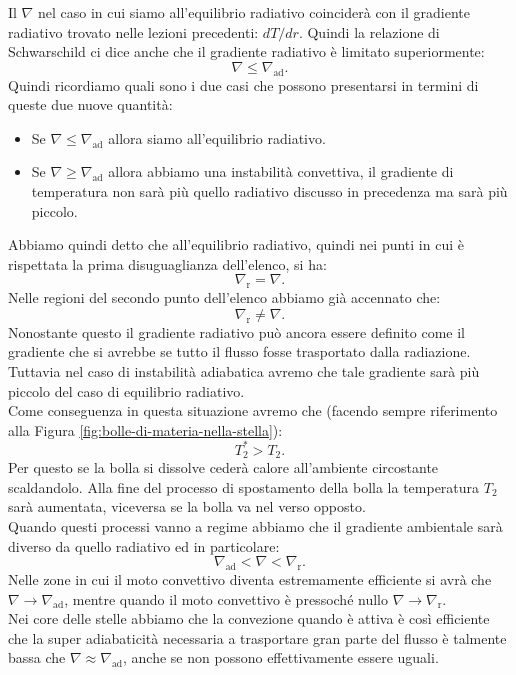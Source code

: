 Il $\nabla$ nel caso in cui siamo all'equilibrio radiativo coinciderà con il gradiente radiativo trovato nelle lezioni precedenti: $dT/dr$.
Quindi la relazione di Schwarschild ci dice anche che il gradiente radiativo è limitato superiormente:
\[
	\nabla \le \nabla_\text{ad} 
.\] 
Quindi ricordiamo quali sono i due casi che possono presentarsi in termini di queste due nuove quantità:
\begin{itemize}
	\item Se $\nabla \le \nabla_\text{ad}$ allora siamo all'equilibrio radiativo.
	\item Se $\nabla \ge \nabla_\text{ad}$ allora abbiamo una instabilità convettiva,
		il gradiente di temperatura non sarà più quello radiativo discusso in
		precedenza ma sarà più piccolo.
\end{itemize}
Abbiamo quindi detto che all'equilibrio radiativo, quindi nei punti in cui è rispettata la prima disuguaglianza dell'elenco, si ha:
\[
	\nabla_\text{r} = \nabla
.\] 
Nelle regioni del secondo punto dell'elenco abbiamo già accennato che:
\[
	\nabla_\text{r} \neq \nabla
.\] 
Nonostante questo il gradiente radiativo può ancora essere definito come il gradiente che si avrebbe se tutto il flusso fosse trasportato dalla radiazione. Tuttavia nel caso di instabilità adiabatica avremo che tale gradiente sarà più piccolo del caso di equilibrio radiativo.\\
Come conseguenza in questa situazione avremo che (facendo sempre riferimento alla Figura \ref{fig:bolle-di-materia-nella-stella}):
\[
	T_2^* > T_2
.\] 
Per questo se la bolla si dissolve cederà calore all'ambiente circostante scaldandolo. Alla fine del processo di spostamento della bolla la temperatura $T_2$ sarà aumentata, viceversa se la bolla va nel verso opposto. \\
Quando questi processi vanno a regime abbiamo che il gradiente ambientale sarà diverso da quello radiativo ed in particolare:
\[
	\nabla_\text{ad} < \nabla < \nabla_\text{r} 
.\] 
Nelle zone in cui il moto convettivo diventa estremamente efficiente si avrà che $\nabla \to \nabla_\text{ad}$, mentre quando il moto convettivo è pressoché nullo $\nabla \to \nabla_\text{r}$. \\
Nei core delle stelle abbiamo che la convezione quando è attiva è così efficiente che la super adiabaticità necessaria a trasportare gran parte del flusso è talmente bassa che $\nabla \approx \nabla_\text{ad}$, anche se non possono effettivamente essere uguali. 
